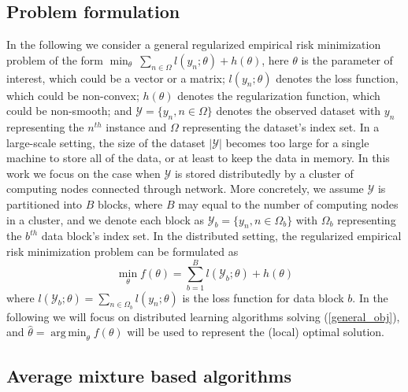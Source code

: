 \documentclass{article}
\DeclareMathOperator*{\argmin}{arg\,min}
\newcommand{\1}[0]{\ensuremath{\boldsymbol{1}}\xspace}
\begin{document}
\subsection{Problem formulation}
In the following we consider a general regularized empirical risk minimization problem of the form $\min_\theta ~ \sum_{n\in\Omega}l(y_n; \theta)+ h(\theta)$, here $\theta$ is the parameter of interest, which could be a vector or a matrix; $l(y_n; \theta)$ denotes the loss function, which could be non-convex; $h(\theta)$ denotes the regularization function, which could be non-smooth; and $\mathcal{Y} = \{y_n, n\in\Omega\}$ denotes the observed dataset with $y_n$ representing the $n^{th}$ instance and $\Omega$ representing the dataset's index set. In a large-scale setting, the size of the dataset $|\mathcal{Y}|$ becomes too large for a single machine to store all of the data, or at least to keep the data in memory. In this work we focus on the case when $\mathcal{Y}$ is stored distributedly by a cluster of computing nodes connected through network. More concretely, we assume $\mathcal{Y}$ is partitioned into $B$ blocks, where $B$ may equal to the number of computing nodes in a cluster, and we denote each block as $\mathcal{Y}_b = \{y_n, n \in \Omega_b\}$ with $\Omega_b$ representing the $b^{th}$ data block's index set. In the distributed setting, the regularized empirical risk minimization problem can be formulated as
\begin{equation}\label{general_obj}
\textstyle\min_{\theta} f(\theta) = \sum_{b=1}^Bl(\mathcal{Y}_b; \theta)+h(\theta)
\end{equation}
where $l(\mathcal{Y}_b; \theta) = \sum_{n\in\Omega_b}l(y_n; \theta)$ is the loss function for data block $b$. In the following we will focus on distributed learning algorithms solving (\ref{general_obj}), and $\hat\theta = \argmin_\theta f(\theta)$ will be used to represent the (local) optimal solution.

\subsection{Average mixture based algorithms}
\end{document}

